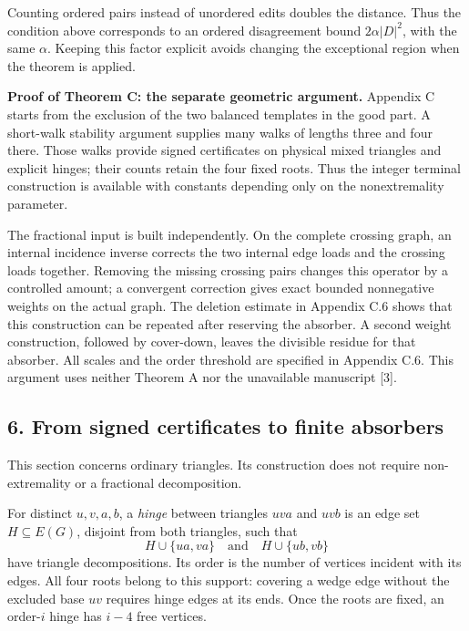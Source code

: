 \documentclass[english,11pt,a4paper]{article}
\newcounter{none}
\begin{document}
Counting ordered pairs instead of unordered edits doubles the distance. Thus the condition above corresponds to an ordered disagreement bound \(2\alpha|D|^2\), with the same \(\alpha\). Keeping this factor explicit avoids changing the exceptional region when the theorem is applied.

\textbf{Proof of Theorem C: the separate geometric argument.} Appendix C starts from the exclusion of the two balanced templates in the good part. A short-walk stability argument supplies many walks of lengths three and four there. Those walks provide signed certificates on physical mixed triangles and explicit hinges; their counts retain the four fixed roots. Thus the integer terminal construction is available with constants depending only on the nonextremality parameter.

The fractional input is built independently. On the complete crossing graph, an internal incidence inverse corrects the two internal edge loads and the crossing loads together. Removing the missing crossing pairs changes this operator by a controlled amount; a convergent correction gives exact bounded nonnegative weights on the actual graph. The deletion estimate in Appendix C.6 shows that this construction can be repeated after reserving the absorber. A second weight construction, followed by cover-down, leaves the divisible residue for that absorber. All scales and the order threshold are specified in Appendix C.6. This argument uses neither Theorem A nor the unavailable manuscript {[}3{]}.

\subsection{6. From signed certificates to finite absorbers}\label{from-signed-certificates-to-finite-absorbers}

This section concerns ordinary triangles. Its construction does not require non-extremality or a fractional decomposition.

For distinct \(u,v,a,b\), a \emph{hinge} between triangles \(uva\) and \(uvb\) is an edge set \(H\subseteq E(G)\), disjoint from both triangles, such that \[H\cup\{ua,va\}\quad\text{and}\quad H\cup\{ub,vb\}
\tag{6.1}\] have triangle decompositions. Its order is the number of vertices incident with its edges. All four roots belong to this support: covering a wedge edge without the excluded base \(uv\) requires hinge edges at its ends. Once the roots are fixed, an order-\(i\) hinge has \(i-4\) free vertices.
\end{document}
